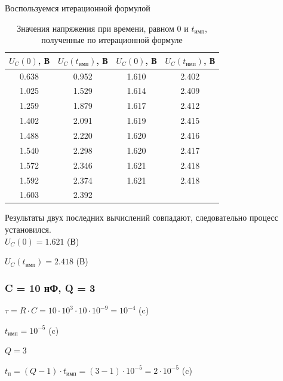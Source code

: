 	Воспользуемся итерационной формулой
\begin{table}[H]

	\begin{center}
	\caption{Значения напряжения при времени, равном $0$ и $t_\text{имп}$, полученные по итерационной формуле}
	\begin{tabular}{|c|c||c|c|}
		\hline 
		$U_C(0)$, В & $U_C(t_\text{имп})$, В & $U_C(0)$, В & $U_C(t_\text{имп})$, В \\ 
		\hline 
		0.638 & 0.952 & 1.610 & 2.402 \\ 
		\hline 
		1.025 & 1.529 & 1.614 & 2.409 \\ 
		\hline 
		1.259 & 1.879 & 1.617 & 2.412 \\ 
		\hline 
		1.402 & 2.091 & 1.619 & 2.415 \\ 
		\hline 
		1.488 & 2.220 & 1.620 & 2.416 \\
		\hline 
		1.540 & 2.298 & 1.620 & 2.417 \\ 
		\hline 
		1.572 & 2.346 & 1.621 & 2.418 \\ 
		\hline 
		1.592 & 2.374 & 1.621 & 2.418 \\ 
		\hline 
		1.603 & 2.392 & & \\
		\hline
		\end{tabular} 	
		
	\end{center}
\end{table}
	Результаты двух последних вычислений совпадают, следовательно процесс установился.\\
	
	$U_C(0) = 1.621$ (В)	
	
	$U_C(t_\text{имп}) = 2.418$ (В)
	

\subsubsection{C = 10 нФ, Q = 3}

$\tau = R \cdot C = 10 \cdot 10^3 \cdot 10 \cdot 10^{-9} = 10^{-4}$ (c)
		
		$t_\text{имп} = 10^{-5}$ (c)
		
		$Q = 3$
		
		$t_\text{п} = (Q - 1) \cdot t_\text{имп} = (3 - 1) \cdot 10^{-5} = 2 \cdot 10^{-5}$ (c)
		
